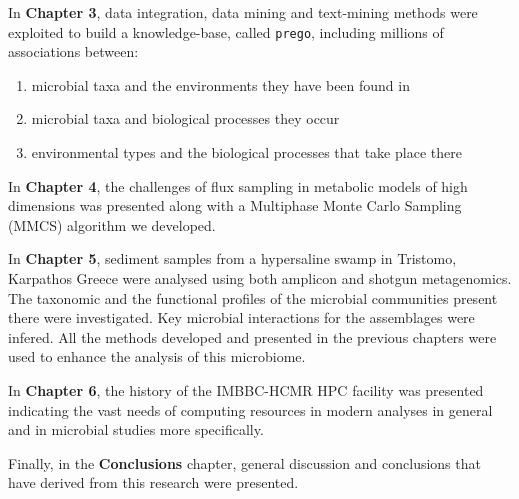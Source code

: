 In \textbf{Chapter 3}, data integration, data mining and text-mining methods were exploited to build a knowledge-base, called \texttt{prego}, including millions of associations between:
\begin{enumerate}
   \item microbial taxa and the environments they have been found in 
   \item microbial taxa and biological processes they occur
   \item environmental types and the biological processes that take place there
\end{enumerate}

In \textbf{Chapter 4}, the challenges of flux sampling in metabolic models of high dimensions was presented along with a Multiphase Monte Carlo Sampling (MMCS) algorithm we developed. 

In \textbf{Chapter 5}, sediment samples from a hypersaline swamp in Tristomo, Karpathos Greece were analysed using both amplicon and shotgun metagenomics. 
The taxonomic and the functional profiles of the microbial communities present there were investigated. 
Key microbial interactions for the assemblages were infered. 
All the methods developed and presented in the previous chapters were used to enhance the analysis of this microbiome.

In \textbf{Chapter 6}, the history of the IMBBC-HCMR HPC facility was presented indicating the vast needs of computing resources in modern analyses in general and in microbial studies more specifically. 


Finally, in the \textbf{Conclusions} chapter, general discussion and conclusions that have derived from this research were presented. 

